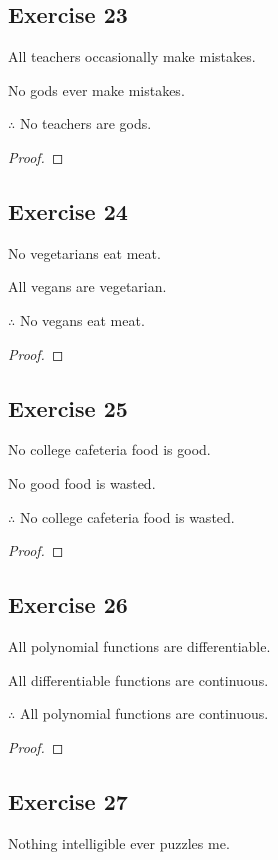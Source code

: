 \documentclass[14pt]{extarticle}
\begin{document}
\subsection{Exercise 23}
All teachers occasionally make mistakes.

No gods ever make mistakes.

$\therefore$ No teachers are gods.

\begin{proof}

\end{proof}

\subsection{Exercise 24}
No vegetarians eat meat.

All vegans are vegetarian.

$\therefore$ No vegans eat meat.

\begin{proof}

\end{proof}

\subsection{Exercise 25}
No college cafeteria food is good.

No good food is wasted.

$\therefore$ No college cafeteria food is wasted.

\begin{proof}

\end{proof}

\subsection{Exercise 26}
All polynomial functions are differentiable.

All differentiable functions are continuous.

$\therefore$ All polynomial functions are continuous.

\begin{proof}

\end{proof}

\subsection{Exercise 27}
Nothing intelligible ever puzzles me.
\end{document}
